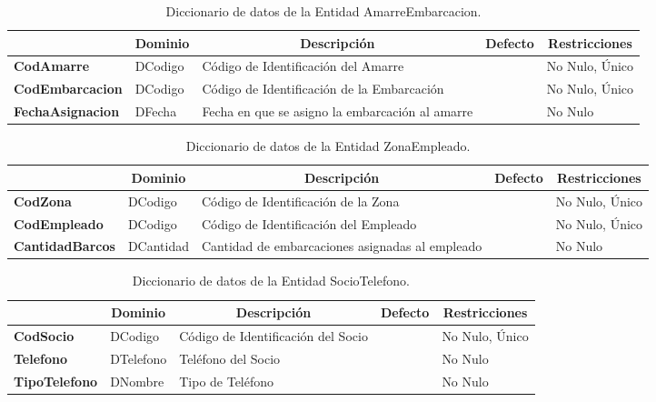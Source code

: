 \begin{table}[H]
\centering
\caption{Diccionario de datos de la Entidad AmarreEmbarcacion.}
\label{tab-DiccR-3g}
\begin{tabular}{>{\bfseries}m{4.0cm}>{}m{3.0cm}>{}m{6.0cm}>{}m{5.0cm}>{}m{2.0cm}}
\toprule
\multicolumn{1}{c}{\textbf{Atributo}} & \multicolumn{1}{c}{\textbf{Dominio}} & \multicolumn{1}{c}{\textbf{Descripción}} & \multicolumn{1}{c}{\textbf{Defecto}} & \multicolumn{1}{c}{\textbf{Restricciones}} \\ \midrule
CodAmarre	&	DCodigo	&	Código de Identificación del Amarre	&		&	No Nulo, Único\\
CodEmbarcacion	&	DCodigo	&	Código de Identificación de la Embarcación	&		&	No Nulo, Único\\
FechaAsignacion	&	DFecha	&	Fecha en que se asigno la embarcación al amarre	&		&	No Nulo\\
\bottomrule
\end{tabular}
\end{table}

\begin{table}[H]
\centering
\caption{Diccionario de datos de la Entidad ZonaEmpleado.}
\label{tab-DiccR-3i}
\begin{tabular}{>{\bfseries}m{4.0cm}>{}m{3.0cm}>{}m{6.0cm}>{}m{5.0cm}>{}m{2.0cm}}
\toprule
\multicolumn{1}{c}{\textbf{Atributo}} & \multicolumn{1}{c}{\textbf{Dominio}} & \multicolumn{1}{c}{\textbf{Descripción}} & \multicolumn{1}{c}{\textbf{Defecto}} & \multicolumn{1}{c}{\textbf{Restricciones}} \\ \midrule
CodZona	&	DCodigo	&	Código de Identificación de la Zona	&		&	No Nulo, Único\\
CodEmpleado	&	DCodigo	&	Código de Identificación del Empleado	&		&	No Nulo, Único\\
CantidadBarcos	&	DCantidad	&	Cantidad de embarcaciones asignadas al empleado	&		&	No Nulo\\
\bottomrule
\end{tabular}
\end{table}

\begin{table}[H]
\centering
\caption{Diccionario de datos de la Entidad SocioTelefono.}
\label{tab-DiccR-3j}
\begin{tabular}{>{\bfseries}m{4.0cm}>{}m{3.0cm}>{}m{6.0cm}>{}m{5.0cm}>{}m{2.0cm}}
\toprule
\multicolumn{1}{c}{\textbf{Atributo}} & \multicolumn{1}{c}{\textbf{Dominio}} & \multicolumn{1}{c}{\textbf{Descripción}} & \multicolumn{1}{c}{\textbf{Defecto}} & \multicolumn{1}{c}{\textbf{Restricciones}} \\ \midrule
CodSocio	&	DCodigo	&	Código de Identificación del Socio	&		&	No Nulo, Único\\
Telefono	&	DTelefono	&	Teléfono del Socio	&		&	No Nulo\\
TipoTelefono	& DNombre		&	Tipo de Teléfono	&		&	No Nulo\\
\bottomrule
\end{tabular}
\end{table}

